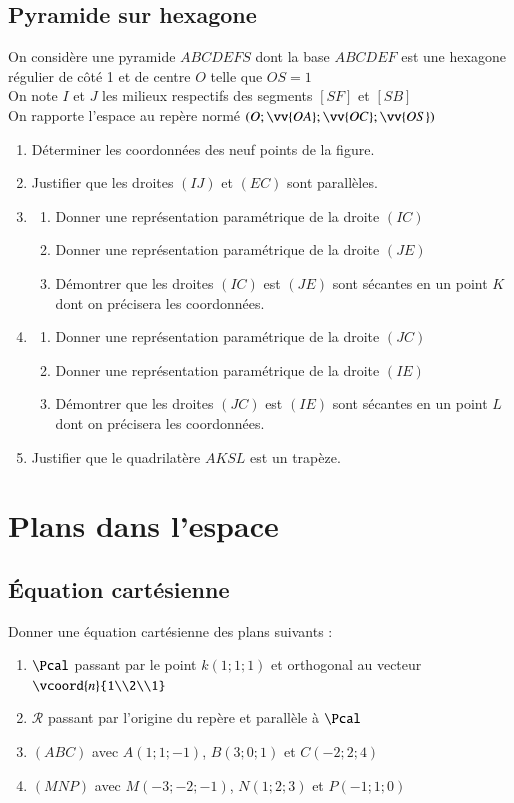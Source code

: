 \documentclass[oneside,12pt]{article}          %
\begin{document}
\subsection{Pyramide sur hexagone}
On considère une pyramide $ABCDEFS$ dont la base $ABCDEF$ est une hexagone régulier de côté 1 et de centre $O$ telle que $OS=1$\\
On note $I$ et $J$ les milieux respectifs des segments $[SF]$ et $[SB]$ \\
On rapporte l'espace au repère normé $(O;\vv{OA};\vv{OC};\vv{OS})$
\begin{enumerate}
    \item Déterminer les coordonnées des neuf points de la figure.
    \item Justifier que les droites $(IJ)$ et $(EC)$ sont parallèles.
    \item \begin{enumerate}
        \item Donner une représentation paramétrique de la droite $(IC)$
        \item Donner une représentation paramétrique de la droite $(JE)$
        \item Démontrer que les droites $(IC)$ est $(JE)$ sont sécantes en un point $K$ dont on précisera les coordonnées.
    \end{enumerate}
    \item \begin{enumerate}
        \item Donner une représentation paramétrique de la droite $(JC)$
        \item Donner une représentation paramétrique de la droite $(IE)$
        \item Démontrer que les droites $(JC)$ est $(IE)$ sont sécantes en un point $L$ dont on précisera les coordonnées.
    \end{enumerate}
    \item Justifier que le quadrilatère $AKSL$ est un trapèze.
\end{enumerate}



\section{Plans dans l'espace}

\subsection{Équation cartésienne}
Donner une équation cartésienne des plans suivants :
\begin{enumerate}
	\item $\Pcal$ passant par le point $k(1;1;1)$ et orthogonal au vecteur $\vcoord{n}{1\\2\\1}$
	\item $\mathcal{R}$ passant par l'origine du repère et parallèle à $\Pcal$
    \item $(ABC)$ avec $A(1;1;-1)$, $B(3;0;1)$ et $C(-2;2;4)$
    \item $(MNP)$ avec $M(-3;-2;-1)$, $N(1;2;3)$ et $P(-1;1;0)$
\end{enumerate}
\end{document}
